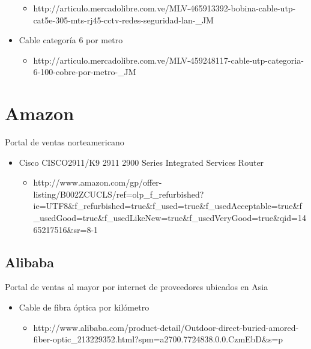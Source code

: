 \documentclass[]{article}
\begin{document}
\begin{itemize}
  \begin{itemize}
  \itemsep1pt\parskip0pt
  \item
    http://articulo.mercadolibre.com.ve/MLV-465913392-bobina-cable-utp-cat5e-305-mts-rj45-cctv-redes-seguridad-lan-\_JM
  \end{itemize}
\item
  Cable categoría 6 por metro

  \begin{itemize}
  \itemsep1pt\parskip0pt
  \item
    http://articulo.mercadolibre.com.ve/MLV-459248117-cable-utp-categoria-6-100-cobre-por-metro-\_JM
  \end{itemize}
\end{itemize}

\section{Amazon}\label{amazon}

Portal de ventas norteamericano

\begin{itemize}
\itemsep1pt\parskip0pt
\item
  Cisco CISCO2911/K9 2911 2900 Series Integrated Services Router

  \begin{itemize}
  \itemsep1pt\parskip0pt
  \item
    http://www.amazon.com/gp/offer-listing/B002ZCUCLS/ref=olp\_f\_refurbished?ie=UTF8\&f\_refurbished=true\&f\_used=true\&f\_usedAcceptable=true\&f\_usedGood=true\&f\_usedLikeNew=true\&f\_usedVeryGood=true\&qid=1465217516\&sr=8-1
  \end{itemize}
\end{itemize}

\subsection{Alibaba}\label{alibaba}

Portal de ventas al mayor por internet de proveedores ubicados en Asia

\begin{itemize}
\itemsep1pt\parskip0pt
\item
  Cable de fibra óptica por kilómetro

  \begin{itemize}
  \itemsep1pt\parskip0pt
  \item
    http://www.alibaba.com/product-detail/Outdoor-direct-buried-amored-fiber-optic\_213229352.html?spm=a2700.7724838.0.0.CzmEbD\&s=p
  \end{itemize}
\end{itemize}
\end{document}
